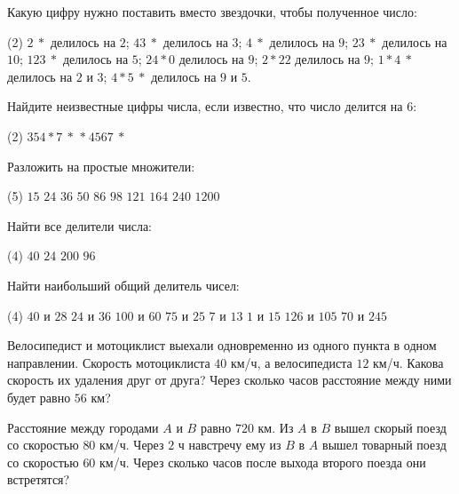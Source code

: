 \begin{class}[number=4]
	\begin{listofex}
	\item Какую цифру нужно поставить вместо звездочки, чтобы полученное число:
	\begin{tasks}(2)
		\task \( 2\:* \) делилось на \( 2 \);
		\task \( 43\:* \) делилось на \( 3 \);
		\task \( 4\:* \) делилось на \( 9 \);
		\task \( 23\:* \) делилось на \( 10 \);
		\task \( 123\:* \) делилось на \( 5 \);
		\task \( 24*0 \) делилось на \( 9 \);
		\task \( 2*22 \) делилось на \( 9 \);
		\task \( 1*4\:* \) делилось на \( 2 \) и \( 3 \);
		\task \( 4*5\:* \) делилось на \( 9 \) и \( 5 \).
	\end{tasks}
	\item Найдите неизвестные цифры числа, если известно, что число делится на \( 6 \):
	\begin{tasks}(2)
		\task \( 354*7\:* \)
		\task \( *\:4567\:* \)
	\end{tasks}
	\item Разложить на простые множители:
	\begin{tasks}(5)
		\task \( 15 \)
		\task \( 24 \)
		\task \( 36 \)
		\task \( 50 \)
		\task \( 86 \)
		\task \( 98 \)
		\task \( 121 \)
		\task \( 164 \)
		\task \( 240 \)
		\task \( 1200 \)
	\end{tasks}
	\item Найти все делители числа:
	\begin{tasks}(4)
		\task \( 40 \)
		\task \( 24 \)
		\task \( 200 \)
		\task \( 96 \)
	\end{tasks}
	\item Найти наибольший общий делитель чисел:
	\begin{tasks}(4)
		\task \( 40 \) и \( 28 \)
		\task \( 24 \) и \( 36 \)
		\task \( 100 \) и \( 60 \)
		\task \( 75 \) и \( 25 \)
		\task \( 7 \) и \( 13 \)
		\task \( 1 \) и \( 15 \)
		\task \( 126 \) и \( 105 \)
		\task \( 70 \) и \( 245 \)
	\end{tasks}
	\item Велосипедист и мотоциклист выехали одновременно из одного пункта в одном направлении. Скорость мотоциклиста \( 40 \) км/ч, а велосипедиста \( 12 \) км/ч. Какова скорость их удаления друг от друга? Через сколько часов расстояние между ними будет равно \( 56 \) км?
	\item Расстояние между городами \( A \) и \( B \) равно \( 720 \) км. Из \( A \) в \( B \) вышел скорый поезд со скоростью \( 80 \) км/ч. Через \( 2 \) ч навстречу ему из \( B \) в \( A \) вышел товарный поезд со скоростью \( 60 \) км/ч. Через сколько часов после выхода второго поезда они встретятся?
	\end{listofex}
\end{class}

